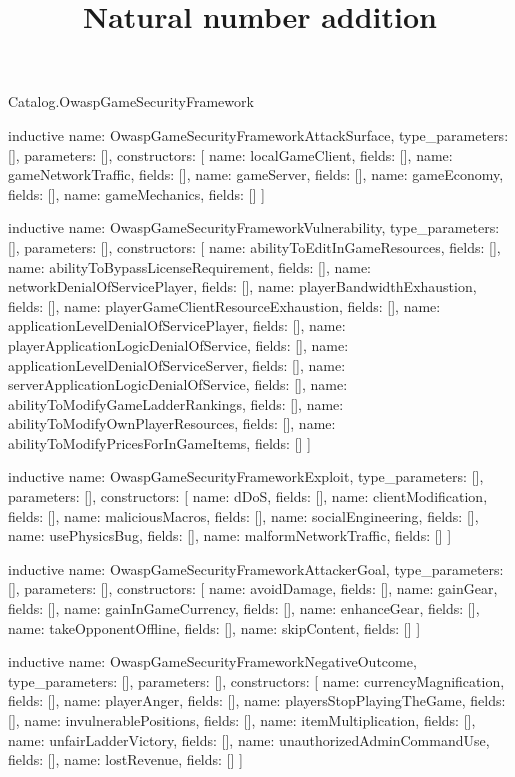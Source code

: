 \begin{lexlean}{Catalog.OwaspGameSecurityFramework}
\title{Natural number addition}
\begin{semanticmodule}
inductive{
  name: OwaspGameSecurityFrameworkAttackSurface,
  type_parameters: [],
  parameters: [],
  constructors: [
    {name: localGameClient, fields: []},
    {name: gameNetworkTraffic, fields: []},
    {name: gameServer, fields: []},
    {name: gameEconomy, fields: []},
    {name: gameMechanics, fields: []}
  ]
}

inductive{
  name: OwaspGameSecurityFrameworkVulnerability,
  type_parameters: [],
  parameters: [],
  constructors: [
    {name: abilityToEditInGameResources, fields: []},
    {name: abilityToBypassLicenseRequirement, fields: []},
    {name: networkDenialOfServicePlayer, fields: []},
    {name: playerBandwidthExhaustion, fields: []},
    {name: playerGameClientResourceExhaustion, fields: []},
    {name: applicationLevelDenialOfServicePlayer, fields: []},
    {name: playerApplicationLogicDenialOfService, fields: []},
    {name: applicationLevelDenialOfServiceServer, fields: []},
    {name: serverApplicationLogicDenialOfService, fields: []},
    {name: abilityToModifyGameLadderRankings, fields: []},
    {name: abilityToModifyOwnPlayerResources, fields: []},
    {name: abilityToModifyPricesForInGameItems, fields: []}
  ]
}

inductive{
  name: OwaspGameSecurityFrameworkExploit,
  type_parameters: [],
  parameters: [],
  constructors: [
    {name: dDoS, fields: []},
    {name: clientModification, fields: []},
    {name: maliciousMacros, fields: []},
    {name: socialEngineering, fields: []},
    {name: usePhysicsBug, fields: []},
    {name: malformNetworkTraffic, fields: []}
  ]
}

inductive{
  name: OwaspGameSecurityFrameworkAttackerGoal,
  type_parameters: [],
  parameters: [],
  constructors: [
    {name: avoidDamage, fields: []},
    {name: gainGear, fields: []},
    {name: gainInGameCurrency, fields: []},
    {name: enhanceGear, fields: []},
    {name: takeOpponentOffline, fields: []},
    {name: skipContent, fields: []}
  ]
}

inductive{
  name: OwaspGameSecurityFrameworkNegativeOutcome,
  type_parameters: [],
  parameters: [],
  constructors: [
    {name: currencyMagnification, fields: []},
    {name: playerAnger, fields: []},
    {name: playersStopPlayingTheGame, fields: []},
    {name: invulnerablePositions, fields: []},
    {name: itemMultiplication, fields: []},
    {name: unfairLadderVictory, fields: []},
    {name: unauthorizedAdminCommandUse, fields: []},
    {name: lostRevenue, fields: []}
  ]
}


\end{semanticmodule}
\end{lexlean}
